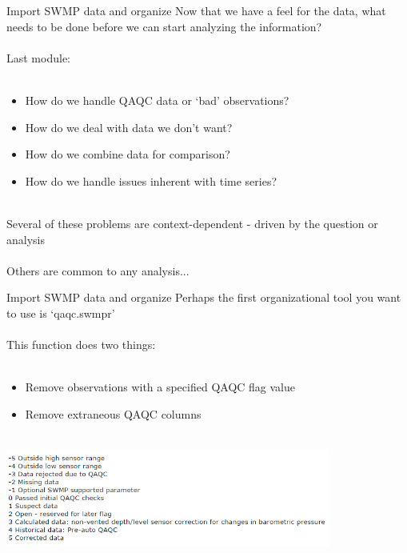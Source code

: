 \documentclass[xcolor=svgnames]{beamer}\usepackage[]{graphicx}\usepackage[]{color}
\begin{document}
\begin{frame}{Import SWMP data and organize}
Now that we have a feel for the data, what needs to be done before we can start analyzing the information? \\~\\
Last module: \\~\\
\begin{itemize}
\item How do we handle QAQC data or `bad' observations?
\item How do we deal with data we don't want?  
\item How do we combine data for comparison?
\item How do we handle issues inherent with time series? \\~\\
\end{itemize}
Several of these problems are context-dependent - driven by the question or analysis \\~\\
Others are common to any analysis...
\end{frame}

\begin{frame}[fragile]{Import SWMP data and organize}
Perhaps the first organizational tool you want to use is `qaqc.swmpr'\\~\\
This function does two things:\\~\\
\begin{itemize}
\item Remove observations with a specified QAQC flag value
\item Remove extraneous QAQC columns \\~\\
\end{itemize}
\centerline{\includegraphics[width = 0.8\textwidth]{qaqc_flags.png}}
\end{frame}
\end{document}
